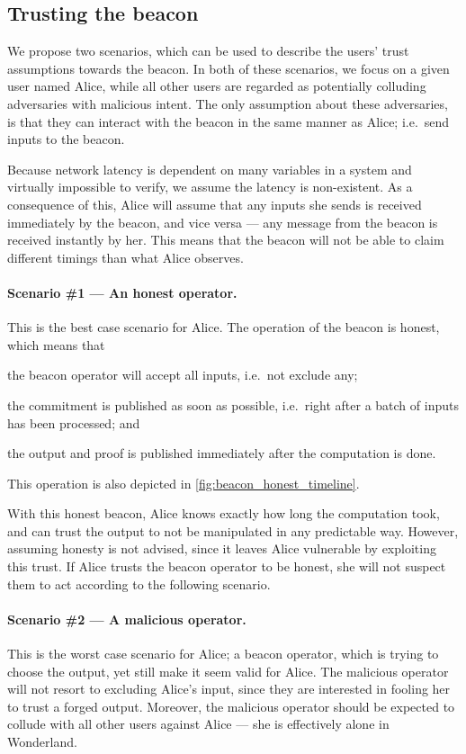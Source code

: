 \subsection{Trusting the beacon}%
\label{sub:trusting_the_beacon}

We propose two scenarios, which can be used to describe the users' trust assumptions towards the beacon.
In both of these scenarios, we focus on a given user named Alice, while all other users are regarded as potentially colluding adversaries with malicious intent.
The only assumption about these adversaries, is that they can interact with the beacon in the same manner as Alice; i.e.\ send inputs to the beacon.

Because network latency is dependent on many variables in a system and virtually impossible to verify, we assume the latency is non-existent.
As a consequence of this, Alice will assume that any inputs she sends is received immediately by the beacon, and vice versa --- any message from the beacon is received instantly by her.
This means that the beacon will not be able to claim different timings than what Alice observes.

\paragraph{Scenario \#1 --- An honest operator.}
This is the best case scenario for Alice.
The operation of the beacon is honest, which means that
\begin{eletterate*}
\item the beacon operator will accept all inputs, i.e.\ not exclude any;
\item the commitment is published as soon as possible, i.e.\ right after a batch of inputs has been processed; and
\item the output and proof is published immediately after the computation is done.
\end{eletterate*}
This operation is also depicted in \cref{fig:beacon_honest_timeline}.

With this honest beacon, Alice knows exactly how long the computation took, and can trust the output to not be manipulated in any predictable way.
However, assuming honesty is not advised, since it leaves Alice vulnerable by exploiting this trust.
If Alice trusts the beacon operator to be honest, she will not suspect them to act according to the following scenario.

\paragraph{Scenario \#2 --- A malicious operator.}
This is the worst case scenario for Alice; a beacon operator, which is trying to choose the output, yet still make it seem valid for Alice.
The malicious operator will not resort to excluding Alice's input, since they are interested in fooling her to trust a forged output.
Moreover, the malicious operator should be expected to collude with all other users against Alice --- she is effectively alone in Wonderland.

